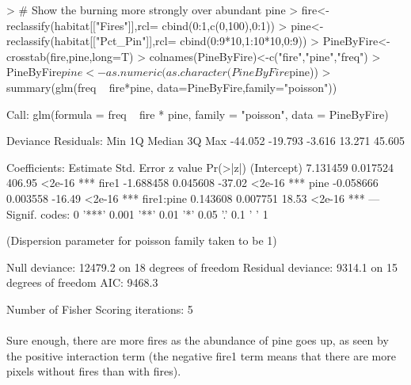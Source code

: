 \documentclass{article}
\begin{document}
\begin{Schunk}
\begin{Sinput}
> # Show the burning more strongly over abundant pine
> fire<-reclassify(habitat[["Fires"]],rcl= cbind(0:1,c(0,100),0:1))
> pine<-reclassify(habitat[["Pct_Pin"]],rcl= cbind(0:9*10,1:10*10,0:9))
> PineByFire<-crosstab(fire,pine,long=T)
> colnames(PineByFire)<-c("fire","pine","freq")
> PineByFire$pine <- as.numeric(as.character(PineByFire$pine))
> summary(glm(freq ~ fire*pine, data=PineByFire,family="poisson"))
\end{Sinput}
\begin{Soutput}
Call:
glm(formula = freq ~ fire * pine, family = "poisson", data = PineByFire)

Deviance Residuals: 
    Min       1Q   Median       3Q      Max  
-44.052  -19.793   -3.616   13.271   45.605  

Coefficients:
             Estimate Std. Error z value Pr(>|z|)    
(Intercept)  7.131459   0.017524  406.95   <2e-16 ***
fire1       -1.688458   0.045608  -37.02   <2e-16 ***
pine        -0.058666   0.003558  -16.49   <2e-16 ***
fire1:pine   0.143608   0.007751   18.53   <2e-16 ***
---
Signif. codes:  0 '***' 0.001 '**' 0.01 '*' 0.05 '.' 0.1 ' ' 1

(Dispersion parameter for poisson family taken to be 1)

    Null deviance: 12479.2  on 18  degrees of freedom
Residual deviance:  9314.1  on 15  degrees of freedom
AIC: 9468.3

Number of Fisher Scoring iterations: 5
\end{Soutput}
\end{Schunk}

\paragraph{}
Sure enough, there are more fires as the abundance of pine goes up, as seen by the positive interaction term (the negative fire1 term means that there are more pixels without fires than with fires).
\end{document}
